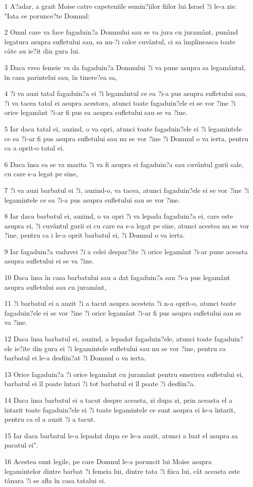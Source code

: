 \par 1 A?adar, a grait Moise catre capeteniile semin?iilor fiilor lui Israel ?i le-a zis: "Iata ce porunce?te Domnul:
\par 2 Omul care va face fagaduin?a Domnului sau se va jura cu juramânt, punând legatura asupra sufletului sau, sa nu-?i calce cuvântul, ci sa împlineasca toate câte au ie?it din gura lui.
\par 3 Daca vreo femeie va da fagaduin?a Domnului ?i va pune asupra sa legamântul, în casa parintelui sau, în tinere?ea sa,
\par 4 ?i va auzi tatal fagaduin?a ei ?i legamântul ce ea ?i-a pus asupra sufletului sau, ?i va tacea tatal ei asupra acestora, atunci toate fagaduin?ele ei se vor ?ine ?i orice legamânt ?i-ar fi pus ea asupra sufletului sau se va ?ine.
\par 5 Iar daca tatal ei, auzind, o va opri, atunci toate fagaduin?ele ei ?i legamintele ce ea ?i-ar fi pus asupra sufletului sau nu se vor ?ine ?i Domnul o va ierta, pentru ca a oprit-o tatal ei.
\par 6 Daca însa ea se va marita ?i va fi asupra ei fagaduin?a sau cuvântul gurii sale, cu care s-a legat pe sine,
\par 7 ?i va auzi barbatul ei ?i, auzind-o, va tacea, atunci fagaduin?ele ei se vor ?ine ?i legamintele ce ea ?i-a pus asupra sufletului sau se vor ?ine.
\par 8 Iar daca barbatul ei, auzind, o va opri ?i va lepada fagaduin?a ei, care este asupra ei, ?i cuvântul gurii ei cu care ea s-a legat pe sine, atunci acestea nu se vor ?ine, pentru ca i le-a oprit barbatul ei, ?i Domnul o va ierta.
\par 9 Iar fagaduin?a vaduvei ?i a celei despar?ite ?i orice legamânt ?i-ar pune aceasta asupra sufletului ei se va ?ine.
\par 10 Daca însa în casa barbatului sau a dat fagaduin?a sau ?i-a pus legamânt asupra sufletului sau cu juramânt,
\par 11 ?i barbatul ei a auzit ?i a tacut asupra acesteia ?i n-a oprit-o, atunci toate fagaduin?ele ei se vor ?ine ?i orice legamânt ?i-ar fi pus asupra sufletului sau se va ?ine.
\par 12 Daca însa barbatul ei, auzind, a lepadat fagaduin?ele, atunci toate fagaduin?ele ie?ite din gura ei ?i legamintele sufletului sau nu se vor ?ine, pentru ca barbatul ei le-a desfiin?at ?i Domnul o va ierta.
\par 13 Orice fagaduin?a ?i orice legamânt cu juramânt pentru smerirea sufletului ei, barbatul ei îl poate întari ?i tot barbatul ei îl poate ?i desfiin?a.
\par 14 Daca însa barbatul ei a tacut despre aceasta, zi dupa zi, prin aceasta el a întarit toate fagaduin?ele ei ?i toate legamintele ce sunt asupra ei le-a întarit, pentru ca el a auzit ?i a tacut.
\par 15 Iar daca barbatul le-a lepadat dupa ce le-a auzit, atunci a luat el asupra sa pacatul ei".
\par 16 Acestea sunt legile, pe care Domnul le-a poruncit lui Moise asupra legamintelor dintre barbat ?i femeia lui, dintre tata ?i fiica lui, cât aceasta este tânara ?i se afla în casa tatalui ei.


